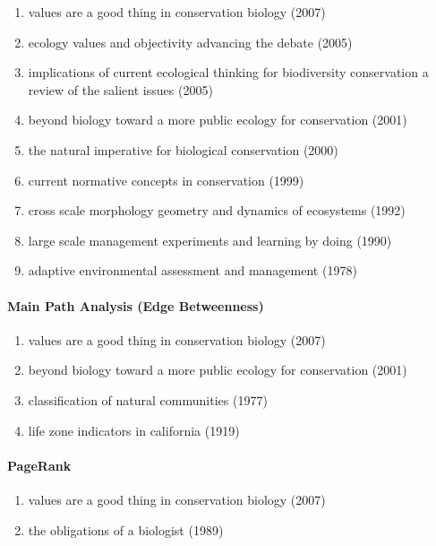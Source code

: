 \documentclass[lettepaper,]{article}
\providecommand{\tightlist}{%
  \setlength{\itemsep}{0pt}\setlength{\parskip}{0pt}}
\let\oldparagraph\paragraph
\renewcommand{\paragraph}[1]{\oldparagraph{#1}\mbox{}}
\begin{document}
\begin{enumerate}
\def\labelenumi{\arabic{enumi}.}
\tightlist
\item
  values are a good thing in conservation biology (2007)
\item
  ecology values and objectivity advancing the debate (2005)
\item
  implications of current ecological thinking for biodiversity
  conservation a review of the salient issues (2005)
\item
  beyond biology toward a more public ecology for conservation (2001)
\item
  the natural imperative for biological conservation (2000)
\item
  current normative concepts in conservation (1999)
\item
  cross scale morphology geometry and dynamics of ecosystems (1992)
\item
  large scale management experiments and learning by doing (1990)
\item
  adaptive environmental assessment and management (1978)
\end{enumerate}

\hypertarget{main-path-analysis-edge-betweenness-6}{%
\paragraph{Main Path Analysis (Edge
Betweenness)}\label{main-path-analysis-edge-betweenness-6}}

\begin{enumerate}
\def\labelenumi{\arabic{enumi}.}
\tightlist
\item
  values are a good thing in conservation biology (2007)
\item
  beyond biology toward a more public ecology for conservation (2001)
\item
  classification of natural communities (1977)
\item
  life zone indicators in california (1919)
\end{enumerate}

\hypertarget{pagerank-9}{%
\paragraph{PageRank}\label{pagerank-9}}

\begin{enumerate}
\def\labelenumi{\arabic{enumi}.}
\tightlist
\item
  values are a good thing in conservation biology (2007)
\item
  the obligations of a biologist (1989)
\end{enumerate}
\end{document}
